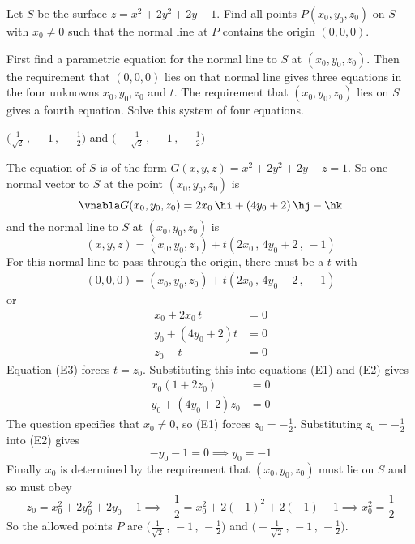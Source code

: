 \begin{question}[M200 2014D] %
Let $S$ be the surface $z = x^2 + 2y^2 + 2y - 1$. Find all points 
$P (x_0,y_0,z_0)$ on $S$ with $x_0 \ne 0$ such that the normal line 
at $P$ contains the origin $(0,0,0)$.
\end{question}

\begin{hint}
First find a parametric equation for the normal line to $S$ at $(x_0,y_0,z_0)$.
Then the requirement that $(0,0,0)$ lies on that normal line gives 
three equations in the four unknowns $x_0,y_0,z_0$ and $t$. The requirement
that $(x_0,y_0,z_0)$ lies on $S$ gives a fourth equation. Solve this system of four equations.
\end{hint}

\begin{answer}
$\big(\frac{1}{\sqrt{2}}\,,\,-1\,,\,-\frac{1}{2}\big)$
and 
  $\big(-\frac{1}{\sqrt{2}}\,,\,-1\,,\,-\frac{1}{2}\big)$
\end{answer}
\begin{solution}
The equation of $S$ is of the form $G(x,y,z) = x^2 + 2y^2 + 2y-z = 1$.
So one normal vector to $S$ at the point $(x_0,y_0,z_0)$ is 
\begin{equation*}
\vnabla G(x_0,y_0,z_0)  = 2x_0\,\hi + (4y_0+2)\,\hj -\hk
\end{equation*}
and the normal line to $S$ at $(x_0,y_0,z_0)$ is
\begin{equation*}
(x,y,z) = (x_0,y_0,z_0) +t( 2x_0\,,\,4y_0+2\,,\, -1)
\end{equation*}
For this normal line to pass through the origin, there must be a $t$
with
\begin{align*}
(0,0,0) = (x_0,y_0,z_0) +t( 2x_0\,,\,4y_0+2\,,\, -1)
\end{align*}
or
\begin{align*}
x_0 + 2x_0\,t & =0 \tag{E1}\\
y_0 +(4y_0+2)t &=0 \tag{E2}\\
z_0 -t &=0 \tag{E3}
\end{align*}
Equation (E3) forces $t=z_0$. Substituting this into equations (E1) and (E2)
gives
\begin{align*}
x_0(1+2z_0) & =0 \tag{E1}\\
y_0 +(4y_0+2)z_0 &=0 \tag{E2}
\end{align*}
The question specifies that $x_0\ne 0$, so (E1) forces $z_0=-\frac{1}{2}$.
Substituting $z_0=-\frac{1}{2}$ into (E2) gives
\begin{equation*}
-y_0-1=0 \implies y_0=-1
\end{equation*}
Finally $x_0$ is determined by the requirement that $(x_0,y_0,z_0)$
must lie on $S$ and so must obey
\begin{equation*}
z_0 = x_0^2 + 2y_0^2 + 2y_0 - 1
\implies -\frac{1}{2} = x_0^2 + 2(-1)^2 +2(-1)-1
\implies x_0^2 = \frac{1}{2}
\end{equation*}
So the allowed points $P$ are 
  $\big(\frac{1}{\sqrt{2}}\,,\,-1\,,\,-\frac{1}{2}\big)$
and 
  $\big(-\frac{1}{\sqrt{2}}\,,\,-1\,,\,-\frac{1}{2}\big)$.
\end{solution}

